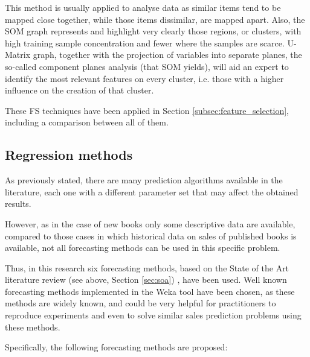 \documentclass[a4paper,10pt,twocolumn,preprint,3p]{elsarticle}
\begin{document}

This method is usually applied to analyse data as similar items tend to be 
mapped close together, while those items dissimilar, are mapped apart.
Also, the SOM graph represents and highlight very clearly those
regions, or clusters, with high training sample concentration and fewer
where the samples are scarce. U-Matrix graph, together with the projection 
of variables into separate planes, the so-called component planes analysis 
(that SOM yields), will aid an expert to identify the most relevant features 
on every cluster, i.e. those with a higher influence on the creation of that 
cluster.

These FS techniques have been applied in Section \ref{subsec:feature_selection}, including a comparison between all of them.


\subsection{Regression methods}
\label{subsec:regression_methods}

As previously stated, there are many prediction algorithms available in the 
literature, each one with a different parameter set that may affect the 
obtained results.

However, as in the case of new books only some descriptive data are available,
compared to those cases in which historical data on sales of published books 
is available, not all forecasting methods can be used in this specific problem.

Thus, in this research six forecasting methods, based on the State of the Art 
literature review (see above, Section \ref{sec:soa}) 
\cite{Madsen2008,ChingChin2010,Thomassey2012,Xia2012,SThomassey2014}, 
have been used. 
Well known forecasting methods implemented in the Weka tool have been chosen, 
as these methods are widely known, and could be very helpful for practitioners 
to reproduce experiments and even to solve similar sales prediction problems 
using these methods.

Specifically, the following forecasting methods are proposed: 
\end{document}
